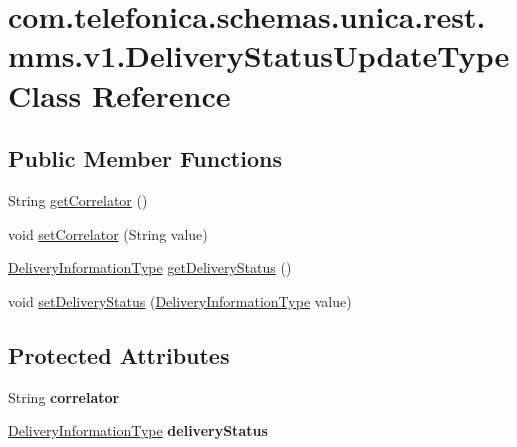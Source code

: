 \hypertarget{classcom_1_1telefonica_1_1schemas_1_1unica_1_1rest_1_1mms_1_1v1_1_1DeliveryStatusUpdateType}{
\section{com.telefonica.schemas.unica.rest.mms.v1.DeliveryStatusUpdateType Class Reference}
\label{classcom_1_1telefonica_1_1schemas_1_1unica_1_1rest_1_1mms_1_1v1_1_1DeliveryStatusUpdateType}
}
\subsection*{Public Member Functions}
\begin{DoxyCompactItemize}
\item 
String \hyperlink{classcom_1_1telefonica_1_1schemas_1_1unica_1_1rest_1_1mms_1_1v1_1_1DeliveryStatusUpdateType_a07197db506bd6f0b512f68b01030bd56}{getCorrelator} ()
\item 
void \hyperlink{classcom_1_1telefonica_1_1schemas_1_1unica_1_1rest_1_1mms_1_1v1_1_1DeliveryStatusUpdateType_a230a893315e6019a850db0c262a2b527}{setCorrelator} (String value)
\item 
\hyperlink{classcom_1_1telefonica_1_1schemas_1_1unica_1_1rest_1_1mms_1_1v1_1_1DeliveryInformationType}{DeliveryInformationType} \hyperlink{classcom_1_1telefonica_1_1schemas_1_1unica_1_1rest_1_1mms_1_1v1_1_1DeliveryStatusUpdateType_ad7402050af3e40ea4ca36222315b22f2}{getDeliveryStatus} ()
\item 
void \hyperlink{classcom_1_1telefonica_1_1schemas_1_1unica_1_1rest_1_1mms_1_1v1_1_1DeliveryStatusUpdateType_abadf159d93358abac23e9020092da5a0}{setDeliveryStatus} (\hyperlink{classcom_1_1telefonica_1_1schemas_1_1unica_1_1rest_1_1mms_1_1v1_1_1DeliveryInformationType}{DeliveryInformationType} value)
\end{DoxyCompactItemize}
\subsection*{Protected Attributes}
\begin{DoxyCompactItemize}
\item 
\hypertarget{classcom_1_1telefonica_1_1schemas_1_1unica_1_1rest_1_1mms_1_1v1_1_1DeliveryStatusUpdateType_ae8f3b2efc973fc1e5adcdee059526ecc}{
String {\bfseries correlator}}
\label{classcom_1_1telefonica_1_1schemas_1_1unica_1_1rest_1_1mms_1_1v1_1_1DeliveryStatusUpdateType_ae8f3b2efc973fc1e5adcdee059526ecc}

\item 
\hypertarget{classcom_1_1telefonica_1_1schemas_1_1unica_1_1rest_1_1mms_1_1v1_1_1DeliveryStatusUpdateType_a2faf8aa6e2046d9c6f83191c89bf9274}{
\hyperlink{classcom_1_1telefonica_1_1schemas_1_1unica_1_1rest_1_1mms_1_1v1_1_1DeliveryInformationType}{DeliveryInformationType} {\bfseries deliveryStatus}}
\label{classcom_1_1telefonica_1_1schemas_1_1unica_1_1rest_1_1mms_1_1v1_1_1DeliveryStatusUpdateType_a2faf8aa6e2046d9c6f83191c89bf9274}

\end{DoxyCompactItemize}


